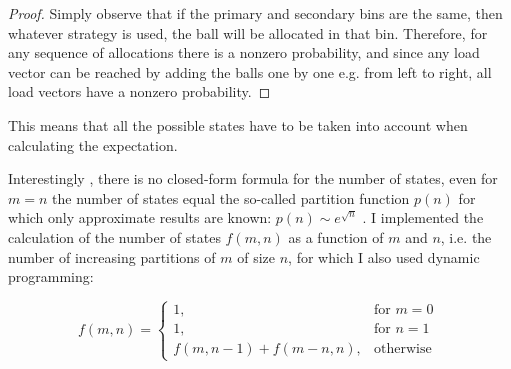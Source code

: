 \begin{proof}
    Simply observe that if the primary and secondary bins are the same, then whatever strategy is used, the ball will be allocated in that bin. Therefore, for any sequence of allocations there is a nonzero probability, and since any load vector can be reached by adding the balls one by one e.g. from left to right, all load vectors have a nonzero probability. 
\end{proof}

This means that all the possible states have to be taken into account when calculating the expectation.



Interestingly , there is no closed-form formula for the number of states, even for $m=n$ the number of states equal the so-called partition function $p(n)$ for which only approximate results are known: $p(n) \sim e^{\sqrt{n}}$ \cite{hardy1918partitionfunction}. I implemented the calculation of the number of states $f(m, n)$ as a function of $m$ and $n$, i.e. the number of increasing partitions of $m$ of size $n$, for which I also used dynamic programming:

\begin{equation} \label{eq: numberofpartitions}
    f(m, n) = \begin{cases}
        1, & \text{for } m=0\\
        1, & \text{for } n=1\\
        f(m,n-1)+f(m-n,n), & \text{otherwise }
    \end{cases}
\end{equation}





